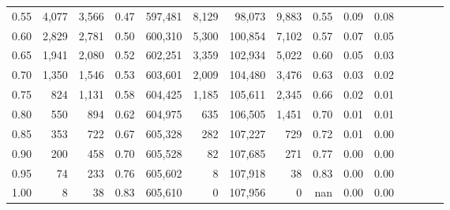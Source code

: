 \begin{tabular}{rrrcrrrrrrrrrrr}
0.55 &    4,077 &   3,566 &                                       0.47 &  597,481 &    8,129 &   98,073 &    9,883 &  0.55 &  0.09 &                         0.08 \\
0.60 &    2,829 &   2,781 &                                       0.50 &  600,310 &    5,300 &  100,854 &    7,102 &  0.57 &  0.07 &                         0.05 \\
0.65 &    1,941 &   2,080 &                                       0.52 &  602,251 &    3,359 &  102,934 &    5,022 &  0.60 &  0.05 &                         0.03 \\
0.70 &    1,350 &   1,546 &                                       0.53 &  603,601 &    2,009 &  104,480 &    3,476 &  0.63 &  0.03 &                         0.02 \\
0.75 &      824 &   1,131 &                                       0.58 &  604,425 &    1,185 &  105,611 &    2,345 &  0.66 &  0.02 &                         0.01 \\
0.80 &      550 &     894 &                                       0.62 &  604,975 &      635 &  106,505 &    1,451 &  0.70 &  0.01 &                         0.01 \\
0.85 &      353 &     722 &                                       0.67 &  605,328 &      282 &  107,227 &      729 &  0.72 &  0.01 &                         0.00 \\
0.90 &      200 &     458 &                                       0.70 &  605,528 &       82 &  107,685 &      271 &  0.77 &  0.00 &                         0.00 \\
0.95 &       74 &     233 &                                       0.76 &  605,602 &        8 &  107,918 &       38 &  0.83 &  0.00 &                         0.00 \\
1.00 &        8 &      38 &                                       0.83 &  605,610 &        0 &  107,956 &        0 &   nan &  0.00 &                         0.00 \\
\bottomrule
\end{tabular}
